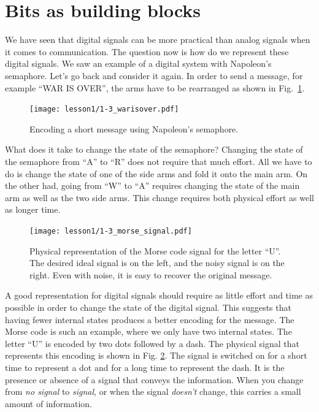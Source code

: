 \section{Bits as building blocks}


We have seen that digital signals can be more practical than analog signals when it comes to communication.
The question now is how do we represent these digital signals.
We saw an example of a digital system with Napoleon's semaphore.
Let's go back and consider it again.
In order to send a message, for example ``WAR IS OVER'', the arms have to be rearranged as shown in Fig.~\ref{fig:1-3_warisover}.

\begin{figure}[t]
    \centering
    \texttt{[image: lesson1/1-3\_warisover.pdf]}
    \caption[Message with Napoleon's semaphore.]{Encoding a short message using Napoleon's semaphore.}
    \label{fig:1-3_warisover}
\end{figure}

What does it take to change the state of the semaphore?
Changing the state of the semaphore from ``A'' to ``R'' does not require that much effort.
All we have to do is change the state of one of the side arms and fold it onto the main arm.
On the other had, going from ``W'' to ``A'' requires changing the state of the main arm as well as the two side arms.
This change requires both physical effort as well as longer time.

\begin{figure}[t]
    \centering
    \texttt{[image: lesson1/1-3\_morse\_signal.pdf]}
    \caption[Morse code signal.]{Physical representation of the Morse code signal for the letter ``U''. The desired ideal signal is on the left, and the noisy signal is on the right. Even with noise, it is easy to recover the original message.}
    \label{fig:1-3_morse_signal}
\end{figure}

A good representation for digital signals should require as little effort and time as possible in order to change the state of the digital signal.
This suggests that having fewer internal states produces a better encoding for the message.
The Morse code is such an example, where we only have two internal states.
The letter ``U'' is encoded by two dots followed by a dash.
The physical signal that represents this encoding is shown in Fig. \ref{fig:1-3_morse_signal}.
The signal is switched on for a short time to represent a dot and for a long time to represent the dash.
It is the presence or absence of a signal that conveys the information.
When you change from \emph{no signal} to \emph{signal}, or when the signal \emph{doesn't} change, this carries a small amount of information.

